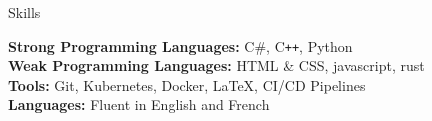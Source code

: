 \documentclass{resume} %
\begin{document}

\begin{rSection}{Skills}

{\bf Strong Programming Languages:} C\#, C\texttt{++}, Python\\
{\bf Weak Programming Languages:} HTML \& CSS, javascript, rust \\
{\bf Tools:} Git, Kubernetes, Docker, LaTeX, CI/CD Pipelines \\
{\bf Languages:} Fluent in English and French

\end{rSection}

\end{document}
